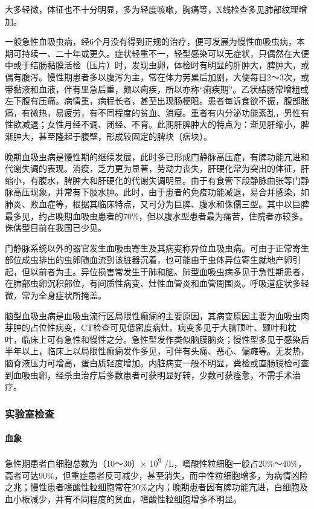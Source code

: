 大多轻微，体征也不十分明显，多为轻度咳嗽，胸痛等，X线检查多见肺部纹理增加。

一般急性血吸虫病，经6个月没有得到正规的治疗，便可发展为慢性血吸虫病，本期可持续一、二十年或更久。症状轻重不一，轻型感染可以无症状，只偶然在大便中或于结肠黏膜活检（压片）时，发现虫卵，体检时有明显的肝肿大，脾肿大，或偶有腹泻。慢性期患者多以腹泻为主，常在体力劳累后加剧，大便每日2～3次，或带黏液和血液，伴有里急后重，颇以痢疾，所以亦称“痢疾期”。乙状结肠常增粗或左下腹有压痛。病情重，病程长者，甚至出现肠梗阻。患者每诉食欲不振，腹部胀痛，有微热，易疲劳，有不同程度的贫血、消瘦。重者有内分泌功能紊乱，男性有性欲减退；女性月经不调、闭经、不育。此期肝脾肿大的特点为：渐见肝缩小，脾渐肿大，甚至隆起于腹壁，形成较固定的脾块（痞块）。

晚期血吸虫病是慢性期的继续发展，此时多已形成门静脉高压症，有脾功能亢进和代谢失调的表现。消瘦，乏力更为显著，劳动力丧失，肝硬化常为突出的体征，肝缩小，有腹水，脾肿大和肝硬化的代谢失调明显。由于有食管下段静脉曲张等门静脉高压现象，并常有下肢水肿。此时，由于患者的免疫功能减退，易合并感染，如肺炎、败血症等，根据其临床特点，又可分为巨脾、腹水和侏儒三型。其中以巨脾最多见，约占晚期血吸虫患者的70\%，但以腹水型患者最为痛苦，住院者亦较多。侏儒型目前在我国已少见。

门静脉系统以外的器官发生血吸虫寄生及其病变称异位血吸虫病。可由于正常寄生部位成虫排出的虫卵随血流到该脏器沉着，也可能由于虫体异位寄生就地产卵引起，但以前者为主。异位损害常发生于肺和脑。肺型血吸虫病多见于急性期患者，在肺部虫卵沉积部位，有间质性病变、灶性血管炎和血管周围炎。呼吸道症状多轻微，常为全身症状所掩盖。

脑型血吸虫病是血吸虫流行区局限性癫痫的主要原因，其病变原因主要为血吸虫肉芽肿的占位性病变，CT检查可见低密度病灶。病变多见于大脑顶叶、颞叶和枕叶，临床上可有急性和慢性之分。急性型发作类似脑膜脑炎；慢性型多见于感染后半年以上，临床上以局限性癫痫发作多见，可伴有头痛、恶心、偏瘫等。无发热，脑脊液压力可增高，蛋白质轻度增加。内脏病变一般不明显，粪检或直肠镜检可查到血吸虫卵，经杀虫治疗后多数患者可获明显好转，少数可获痊愈，不需手术治疗。

\subsubsection{实验室检查}

\paragraph{血象}

急性期患者白细胞总数为（10～30）× 10\textsuperscript{9}
/L，嗜酸性粒细胞一般占20\%～40\%，高者可达90\%，但重症患者反可减少，甚至消失，而中性粒细胞增多，为病情凶险之兆；慢性患者嗜酸性粒细胞常在20\%之内；晚期患者因有脾功能亢进，白细胞及血小板减少，并有不同程度的贫血，嗜酸性粒细胞增多不明显。

